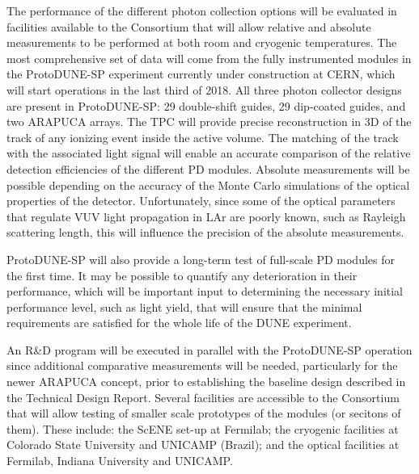 The performance of the different photon collection options will be 
evaluated in facilities available to the Consortium that will allow
relative and absolute measurements to be performed at both room and cryogenic temperatures.
The most comprehensive set of data will come from the fully instrumented modules in the ProtoDUNE-SP experiment currently 
under construction at CERN, which will start operations in the last third of \num{2018}.
All  three photon collector designs are present in ProtoDUNE-SP: \num{29} 
double-shift guides, \num{29} dip-coated guides, and two ARAPUCA arrays. 
The TPC will provide precise reconstruction in 3D of the track of any ionizing event inside the active volume. The 
matching of the track with the associated light signal will enable an
accurate comparison of the relative detection efficiencies of the different PD 
modules. 
Absolute measurements will be possible depending on the accuracy of the
Monte Carlo simulations of the optical properties of the detector. 
Unfortunately, since some of the optical parameters that 
regulate VUV light propagation in LAr are poorly known, such as Rayleigh 
scattering length, this will influence the precision of the absolute 
measurements. 

ProtoDUNE-SP will also provide a long-term test of full-scale PD modules for the first time. It may be possible to quantify any deterioration in their performance, which will be important input to determining the necessary initial performance level, such as light yield, that will ensure that the minimal requirements are satisfied for the whole life of the DUNE experiment.

An R\&D program will be executed in parallel with the ProtoDUNE-SP operation since 
additional comparative measurements will be needed, particularly for the newer ARAPUCA concept, prior to establishing the baseline design described in the Technical Design Report.
Several facilities are accessible to the Consortium that will allow testing of smaller scale prototypes of the modules (or secitons of them). 
These include: the ScENE set-up at Fermilab; the cryogenic facilities at Colorado State University and UNICAMP (Brazil); and the optical facilities at Fermilab, Indiana University and UNICAMP.

